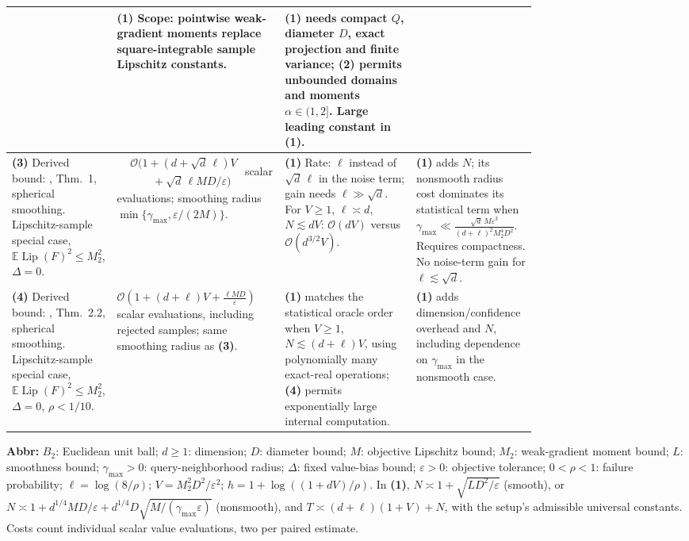 \begin{table}[tp]
\begin{threeparttable}
\begin{tabularx}{\linewidth}{@{}>{\raggedright\arraybackslash}p{0.20\linewidth}>{\raggedright\arraybackslash}p{0.32\linewidth}>{\raggedright\arraybackslash}p{0.25\linewidth}>{\raggedright\arraybackslash}X@{}}
& \textbf{(1)} Scope: pointwise weak-gradient moments replace square-integrable sample Lipschitz constants.
& \textbf{(1)} needs compact $Q$, diameter $D$, exact projection and finite variance; \textbf{(2)} permits unbounded domains and moments $\alpha\in(1,2]$. Large leading constant in \textbf{(1)}. \\
\midrule
\textbf{(3)} Derived bound: \citep{apzoLiu2026v3}, Thm.~1, spherical smoothing. Lipschitz-sample special case, $\mathbb E\operatorname{Lip}(F)^2\le M_2^2$, $\Delta=0$.
& $\begin{aligned}&\mathcal{O}\!\bigl(1+(d+\sqrt d\,\ell)V\\&\qquad{}+\sqrt d\,\ell MD/\varepsilon\bigr)\end{aligned}$ scalar evaluations; smoothing radius $\min\{\gamma_{\max},\varepsilon/(2M)\}$.
& \textbf{(1)} Rate: $\ell$ instead of $\sqrt d\,\ell$ in the noise term; gain needs $\ell\gg\sqrt d$. For $V\ge1$, $\ell\asymp d$, $N\lesssim dV$: $\mathcal{O}(dV)$ versus $\mathcal{O}(d^{3/2}V)$.
& \textbf{(1)} adds $N$; its nonsmooth radius cost dominates its statistical term when $\gamma_{\max}\ll\frac{\sqrt d\,M\varepsilon^3}{(d+\ell)^2M_2^4D^2}$. Requires compactness. No noise-term gain for $\ell\lesssim\sqrt d$. \\
\midrule
\textbf{(4)} Derived bound: \citep{apzoZhang2026v1}, Thm.~2.2, spherical smoothing. Lipschitz-sample special case, $\mathbb E\operatorname{Lip}(F)^2\le M_2^2$, $\Delta=0$, $\rho<1/10$.
& $\mathcal{O}\!\left(1+(d+\ell)V+\frac{\ell MD}{\varepsilon}\right)$ scalar evaluations, including rejected samples; same smoothing radius as \textbf{(3)}.
& \textbf{(1)} matches the statistical oracle order when $V\ge1$, $N\lesssim(d+\ell)V$, using polynomially many exact-real operations; \textbf{(4)} permits exponentially large internal computation.
& \textbf{(1)} adds dimension/confidence overhead and $N$, including dependence on $\gamma_{\max}$ in the nonsmooth case. \\
\bottomrule
\end{tabularx}
\begin{tablenotes}[flushleft]\footnotesize
\item[] \textbf{Abbr:} $B_2$: Euclidean unit ball; $d\ge1$: dimension; $D$: diameter bound; $M$: objective Lipschitz bound; $M_2$: weak-gradient moment bound; $L$: smoothness bound; $\gamma_{\max}>0$: query-neighborhood radius; $\Delta$: fixed value-bias bound; $\varepsilon>0$: objective tolerance; $0<\rho<1$: failure probability; $\ell=\log(8/\rho)$; $V=M_2^2D^2/\varepsilon^2$; $h=1+\log((1+dV)/\rho)$. In \textbf{(1)}, $N\asymp1+\sqrt{LD^2/\varepsilon}$ (smooth), or $N\asymp1+d^{1/4}MD/\varepsilon+d^{1/4}D\sqrt{M/(\gamma_{\max}\varepsilon)}$ (nonsmooth), and $T\asymp(d+\ell)(1+V)+N$, with the setup's admissible universal constants. Costs count individual scalar value evaluations, two per paired estimate.
\end{tablenotes}
\end{threeparttable}
\end{table}
\clearpage
